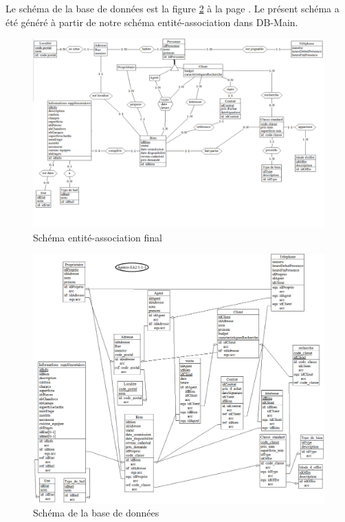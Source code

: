 Le schéma de la base de données est la figure \ref{fig:bdd} à la page \pageref{fig:bdd}.
Le présent schéma a été généré à partir de notre schéma entité-association dans DB-Main.





\newpage
\begin{landscape}
	\begin{figure}
		\centering
		\includegraphics[width=25cm]{association.png}
		\caption{Schéma entité-association final}
		\label{fig:ea}
	\end{figure}
\end{landscape}

\begin{figure}[H]
	\centering
	\includegraphics[width=16cm]{relationnel.png}
	\caption{Schéma de la base de données}
	\label{fig:bdd}
\end{figure}

